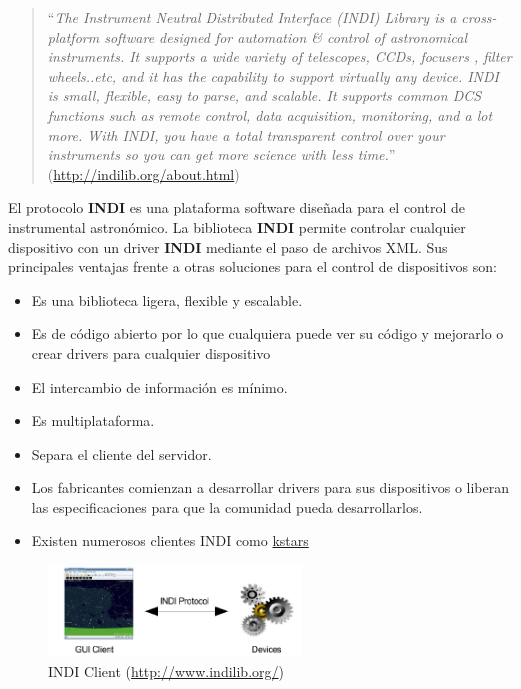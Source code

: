 \begin{quote}``\textit{The Instrument Neutral Distributed Interface (INDI) Library is a cross-platform software designed for automation & control of astronomical instruments. It supports a wide variety of telescopes, CCDs, focusers , filter wheels..etc, and it has the capability to support virtually any device. INDI is small, flexible, easy to parse, and scalable. It supports common DCS functions such as remote control, data acquisition, monitoring, and a lot more. With INDI, you have a total transparent control over your instruments so you can get more science with less time.}''
\newline(\href{http://indilib.org/about.html}{http://indilib.org/about.html})
\end{quote}

\bigskip

El protocolo \textbf{INDI} es una plataforma software diseñada para el control de instrumental astronómico. La biblioteca \textbf{INDI} permite controlar cualquier dispositivo con un driver \textbf{INDI} mediante el paso de archivos XML. Sus principales ventajas frente a otras soluciones para el control de dispositivos son:


\begin{itemize}
  \item Es una biblioteca ligera, flexible y escalable.
  \item Es de código abierto por lo que cualquiera puede ver su código y mejorarlo o crear drivers para cualquier dispositivo
  \item El intercambio de información es mínimo.
  \item Es multiplataforma.
  \item Separa el cliente del servidor.
  \item Los fabricantes comienzan a desarrollar drivers para sus dispositivos o liberan las especificaciones para que la comunidad pueda desarrollarlos.
  \item Existen numerosos clientes INDI como \href{https://edu.kde.org/kstars/}{kstars}

\end{itemize}

\bigskip
\begin{figure}[!ht]
  \begin{center}
    \includegraphics[width=0.6\textwidth]{../images/Indi_client.png}
    \caption{INDI Client (\href{http://www.indilib.org/}{http://www.indilib.org/})}
    \label{fig:indi_client}
  \end{center}
\end{figure}

